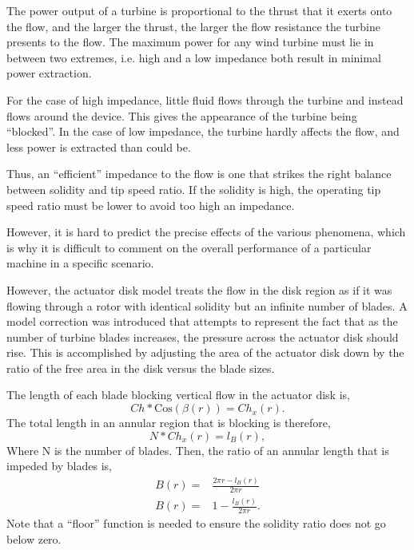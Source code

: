 The power output of a turbine is proportional to the thrust that it
exerts onto the flow, and the larger the thrust, the larger the flow
resistance the turbine presents to the flow. The maximum power for any
wind turbine must lie in between two extremes, i.e. high and
a low impedance both result in minimal power
extraction\cite{solidity_oxford}.  

For the case of high impedance, little fluid flows through the
turbine and instead flows around the device. This gives the appearance of
the turbine being ``blocked''. In the case of low impedance, the turbine
hardly affects the flow, and less power is extracted than could be. 

Thus, an ``efficient'' impedance to the flow is one that strikes the 
right balance between solidity and tip speed ratio. If the solidity is
high, the operating tip speed ratio must be lower to avoid too high an
impedance. 

However, it is hard to predict the precise effects of the various
phenomena, which is why it is difficult to comment on the overall
performance of a particular machine in a specific
scenario. %

However, the actuator disk model treats the flow in the disk region as
if it was flowing through a rotor with identical solidity but an
infinite number of blades. A model correction was introduced that
attempts to represent the fact that as the number of turbine blades
increases, the pressure across the actuator disk should rise. This is
accomplished by adjusting the area of the actuator disk down by the
ratio of the free area in the disk versus the blade sizes. 





%
%



The length of each blade blocking vertical flow in the actuator disk is, 
\begin{equation}
  Ch * \text{Cos}(\beta(r)) = Ch_x(r). 
\end{equation}
The total length in an annular region that is blocking is therefore,
\begin{equation}
  N * Ch_x(r) = l_B(r),
\end{equation}
Where N is the number of blades. 
Then, the ratio of an annular length that is impeded by blades is, 
\begin{eqnarray}
 B(r) =& \frac{2\pi r- l_B(r)}{2 \pi r}\\
 B(r) =& 1- \frac{l_B(r)}{2 \pi r}. 
\end{eqnarray}
Note that a ``floor'' function is needed to ensure the solidity ratio
does not go below zero. 


